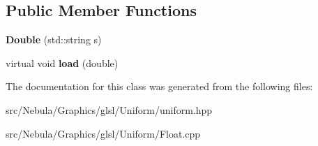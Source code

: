 \subsection*{\-Public \-Member \-Functions}
\begin{DoxyCompactItemize}
\item 
\hypertarget{classNeb_1_1glsl_1_1Uniform_1_1Scalar_1_1Double_a69bb07fb2fa171a1067bf7558b91ec57}{{\bfseries \-Double} (std\-::string s)}\label{classNeb_1_1glsl_1_1Uniform_1_1Scalar_1_1Double_a69bb07fb2fa171a1067bf7558b91ec57}

\item 
\hypertarget{classNeb_1_1glsl_1_1Uniform_1_1Scalar_1_1Double_ace7c6e19de12c3d9e495117944b40249}{virtual void {\bfseries load} (double)}\label{classNeb_1_1glsl_1_1Uniform_1_1Scalar_1_1Double_ace7c6e19de12c3d9e495117944b40249}

\end{DoxyCompactItemize}


\-The documentation for this class was generated from the following files\-:\begin{DoxyCompactItemize}
\item 
src/\-Nebula/\-Graphics/glsl/\-Uniform/uniform.\-hpp\item 
src/\-Nebula/\-Graphics/glsl/\-Uniform/\-Float.\-cpp\end{DoxyCompactItemize}
